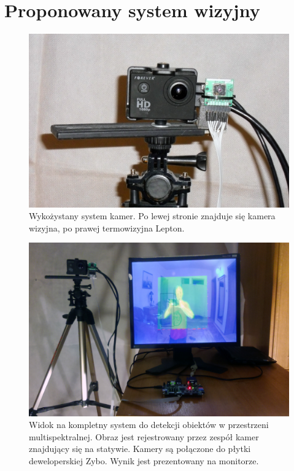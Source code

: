 \chapter{Proponowany system wizyjny}


\begin{figure}
\centering
\includegraphics[width=0.65\linewidth]{images/kameraRGBIR.jpg}
\caption[Wykożystany system kamer.]{Wykożystany system kamer. Po lewej stronie znajduje się kamera wizyjna, po prawej termowizyjna Lepton.}
\label{fig:kameraRGBIR}
\end{figure}

\begin{figure}
\centering
\includegraphics[width=0.65\linewidth]{images/systemOverview.jpg}
\caption[Widok na kompletny system.]{Widok na kompletny system do detekcji obiektów w przestrzeni multispektralnej. Obraz jest rejestrowany przez zespół kamer znajdujący się na statywie. Kamery są połączone do płytki deweloperskiej Zybo. Wynik jest prezentowany na monitorze.}
\label{fig:systemOverview}
\end{figure}



